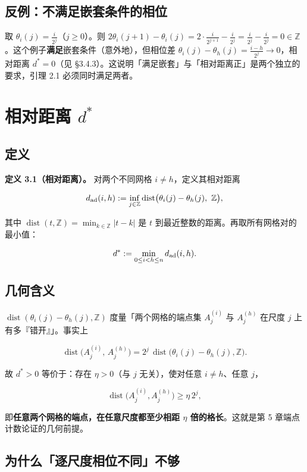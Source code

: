 \documentclass[a4paper,11pt,openany]{ctexbook}
\numberwithin{equation}{chapter}
\numberwithin{figure}{chapter}
\numberwithin{table}{chapter}
\begin{document}
\subsection{反例：不满足嵌套条件的相位}

取 $\theta_i(j)=\frac{i}{2^j}$（$j\ge0$）。则 $2\theta_i(j+1)-\theta_i(j)=2\cdot\frac{i}{2^{j+1}}-\frac{i}{2^j}=\frac{i}{2^j}-\frac{i}{2^j}=0\in\mathbb Z$。这个例子\textbf{满足}嵌套条件（意外地），但相位差 $\theta_i(j)-\theta_h(j)=\frac{i-h}{2^j}\to0$，相对距离 $d^*=0$（见 §3.4.3）。这说明「满足嵌套」与「相对距离正」是两个独立的要求，引理 2.1 必须同时满足两者。

\section{相对距离 $d^*$}

\subsection{定义}

\textbf{定义 3.1（相对距离）。} 对两个不同网格 $i\neq h$，定义其相对距离

$$d_{\rm ad}(i,h):=\inf_{j\in\mathbb Z}\operatorname{dist}\bigl(\theta_i(j)-\theta_h(j),\ \mathbb Z\bigr),$$

其中 $\operatorname{dist}(t,\mathbb Z)=\min_{k\in\mathbb Z}|t-k|$ 是 $t$ 到最近整数的距离。再取所有网格对的最小值：

$$d^*:=\min_{0\le i<h\le n}d_{\rm ad}(i,h).$$

\subsection{几何含义}

$\operatorname{dist}(\theta_i(j)-\theta_h(j),\mathbb Z)$ 度量「两个网格的端点集 $A_j^{(i)}$ 与 $A_j^{(h)}$ 在尺度 $j$ 上有多『错开』」。事实上

$$\operatorname{dist}\bigl(A_j^{(i)},\,A_j^{(h)}\bigr)=2^j\,\operatorname{dist}\bigl(\theta_i(j)-\theta_h(j),\mathbb Z\bigr).$$

故 $d^*>0$ 等价于：存在 $\eta>0$（与 $j$ 无关），使对任意 $i\neq h$、任意 $j$，

$$\operatorname{dist}\bigl(A_j^{(i)},A_j^{(h)}\bigr)\ge \eta\,2^j,$$

即\textbf{任意两个网格的端点，在任意尺度都至少相距 $\eta$ 倍的格长}。这就是第 5 章端点计数论证的几何前提。

\subsection{为什么「逐尺度相位不同」不够}
\end{document}
